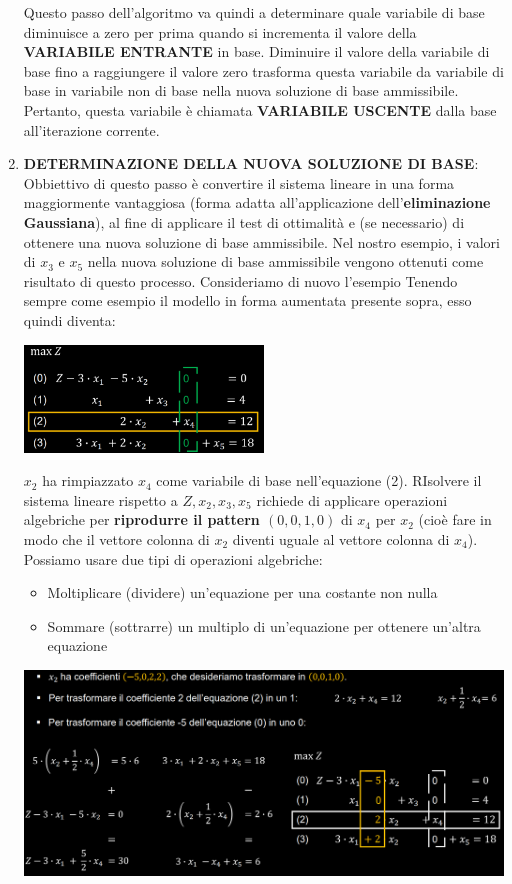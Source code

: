 \documentclass[12pt]{article}
\begin{document}
\begin{enumerate}
\begin{center}
    \end{center}
    Questo passo dell'algoritmo va quindi a determinare quale variabile di base diminuisce a zero per prima quando si incrementa il valore della \textbf{VARIABILE ENTRANTE} in base.
    Diminuire il valore della variabile di base fino a raggiungere il valore zero trasforma questa variabile da variabile di base in variabile non di base nella nuova soluzione di base ammissibile.
    Pertanto, questa variabile è chiamata \textbf{VARIABILE USCENTE} dalla base all'iterazione corrente. 
    \item \textbf{DETERMINAZIONE DELLA NUOVA SOLUZIONE DI BASE}: Obbiettivo di questo passo è convertire il sistema lineare in una forma maggiormente vantaggiosa (forma adatta all'applicazione dell'\textbf{eliminazione Gaussiana}), al fine di applicare il test di ottimalità e (se necessario) di ottenere una nuova soluzione di base ammissibile.
    Nel nostro esempio, i valori di $x_3$ e $x_5$ nella nuova soluzione di base ammissibile vengono ottenuti come risultato di questo processo. Consideriamo di nuovo l'esempio
    Tenendo sempre come esempio il modello in forma aumentata presente sopra, esso quindi diventa:
    \begin{center}
        \includegraphics[width = 0.50\textwidth]{Images/25.png}
    \end{center}
    $x_2$ ha rimpiazzato $x_4$ come variabile di base nell'equazione (2). RIsolvere il sistema lineare rispetto a $Z, x_2, x_3, x_5$ richiede di applicare operazioni algebriche per \textbf{riprodurre il pattern $(0,0,1,0)$} di $x_4$ per $x_2$ (cioè fare in modo che il vettore colonna di $x_2$ diventi uguale al vettore colonna di $x_4$).
    Possiamo usare due tipi di operazioni algebriche:
    \begin{itemize}
        \item Moltiplicare (dividere) un'equazione per una costante non nulla
        \item Sommare (sottrarre) un multiplo di un'equazione per ottenere un'altra \newline equazione
    \end{itemize}
    \begin{center}
        \includegraphics[width = 1\linewidth]{Images/26.png}

\end{center}
\end{enumerate}
\end{document}

